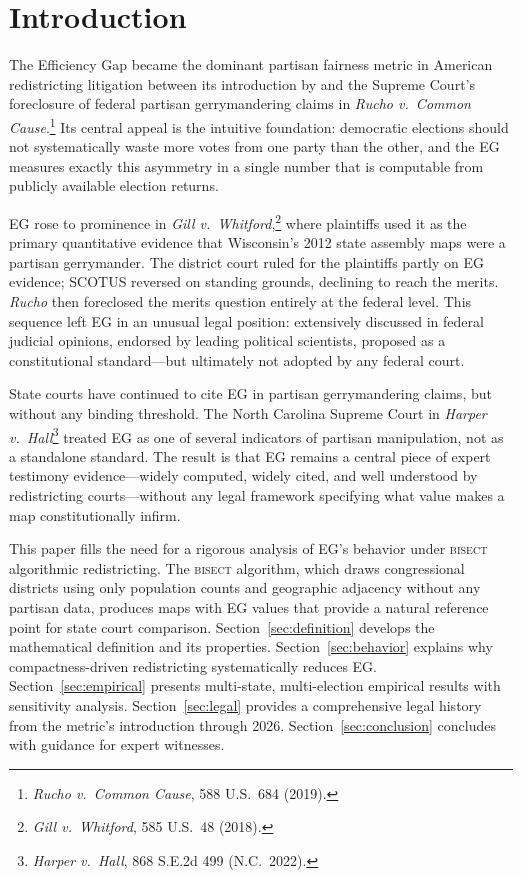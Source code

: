 \section{Introduction}
\label{sec:introduction}

The Efficiency Gap became the dominant partisan fairness metric in American redistricting
litigation between its introduction by \citet{stephanopoulosMcGhee2015} and the Supreme
Court's foreclosure of federal partisan gerrymandering claims in \textit{Rucho v.\
Common Cause}.\footnote{\textit{Rucho v.\ Common Cause}, 588 U.S.\ 684 (2019).}
Its central appeal is the intuitive foundation: democratic elections should not
systematically waste more votes from one party than the other, and the EG
measures exactly this asymmetry in a single number that is computable from
publicly available election returns.

EG rose to prominence in \textit{Gill v.\ Whitford},\footnote{\textit{Gill v.\
Whitford}, 585 U.S.\ 48 (2018).} where plaintiffs used it as the primary
quantitative evidence that Wisconsin's 2012 state assembly maps were a partisan
gerrymander. The district court ruled for the plaintiffs partly on EG evidence;
SCOTUS reversed on standing grounds, declining to reach the merits. \textit{Rucho}
then foreclosed the merits question entirely at the federal level. This sequence
left EG in an unusual legal position: extensively discussed in federal judicial
opinions, endorsed by leading political scientists, proposed as a constitutional
standard---but ultimately not adopted by any federal court.

State courts have continued to cite EG in partisan gerrymandering claims, but
without any binding threshold. The North Carolina Supreme Court in \textit{Harper
v.\ Hall}\footnote{\textit{Harper v.\ Hall}, 868 S.E.2d 499 (N.C.\ 2022).}
treated EG as one of several indicators of partisan manipulation, not as a
standalone standard. The result is that EG remains a central piece of expert
testimony evidence---widely computed, widely cited, and well understood by
redistricting courts---without any legal framework specifying what value makes
a map constitutionally infirm.

This paper fills the need for a rigorous analysis of EG's behavior under
\textsc{bisect} algorithmic redistricting. The \textsc{bisect} algorithm,
which draws congressional districts using only population counts and geographic
adjacency without any partisan data, produces maps with EG values that provide
a natural reference point for state court comparison. Section~\ref{sec:definition}
develops the mathematical definition and its properties. Section~\ref{sec:behavior}
explains why compactness-driven redistricting systematically reduces EG.
Section~\ref{sec:empirical} presents multi-state, multi-election empirical
results with sensitivity analysis. Section~\ref{sec:legal} provides a
comprehensive legal history from the metric's introduction through 2026.
Section~\ref{sec:conclusion} concludes with guidance for expert witnesses.
